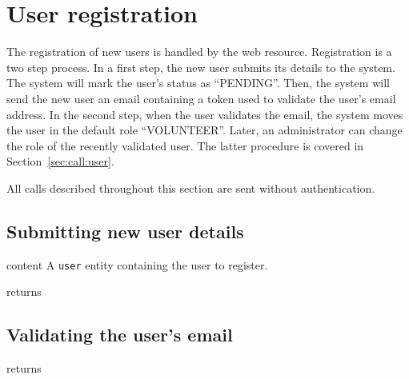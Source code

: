 \section{User registration}

The registration of new users is handled by the
web resource. Registration is a two step process. In a first step, the new user
submits its details to the system. The system will mark the user's status as
``PENDING''. Then, the system will send the new user an email containing a token
used to validate the user's email address. In the second step, when the user
validates the email, the system moves the user in the default role
``VOLUNTEER''. Later, an administrator can change the role of the recently
validated user. The latter procedure is covered in Section~\ref{sec:call:user}.

All calls described throughout this section are sent without authentication.

\subsection{Submitting new user details}

\begin{apidata}{content}
  A \texttt{user} entity containing the user to register.
\end{apidata}
\begin{apidata}{returns}
  \begin{datalist}
  \end{datalist}
\end{apidata}

\subsection{Validating the user's email}
\begin{apidata}{returns}
  \begin{datalist}
  \end{datalist}
\end{apidata}

